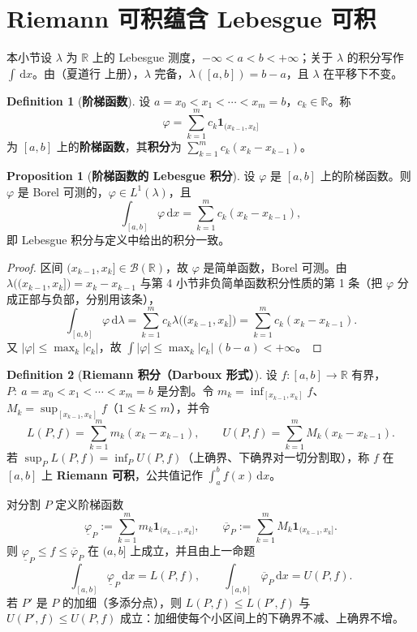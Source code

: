 \documentclass[oneside]{book}
\theoremstyle{definition}
\newcommand{\R}{\mathbb{R}}
\newcommand{\dd}{\mathrm{d}}
\theoremstyle{definition}
\newtheorem{proposition}{Proposition}[section]
\newtheorem{definition}{Definition}[section]
\begin{document}
	\section{Riemann 可积蕴含 Lebesgue 可积}
	
	本小节设 $\lambda$ 为 $\R$ 上的 Lebesgue 测度，$-\infty<a<b<+\infty$；关于 $\lambda$ 的积分写作 $\int\,\dd x$。由（夏道行 上册），$\lambda$ 完备，$\lambda([a,b])=b-a$，且 $\lambda$ 在平移下不变。
	
	\begin{definition}[\bfseries{阶梯函数}]
		设 $a=x_0<x_1<\cdots<x_m=b$，$c_k\in\R$。称
		\[
		\varphi=\sum_{k=1}^{m}c_k\mathbf{1}_{(x_{k-1},x_k]}
		\]
		为 $[a,b]$ 上的\textbf{阶梯函数}，其\textbf{积分}为 $\sum_{k=1}^{m}c_k(x_k-x_{k-1})$。
	\end{definition}
	
	\begin{proposition}[\bfseries{阶梯函数的 Lebesgue 积分}]
		设 $\varphi$ 是 $[a,b]$ 上的阶梯函数。则 $\varphi$ 是 Borel 可测的，$\varphi\in L^{1}(\lambda)$，且
		\[
		\int_{[a,b]}\varphi\,\dd x=\sum_{k=1}^{m}c_k(x_k-x_{k-1}),
		\]
		即 Lebesgue 积分与定义中给出的积分一致。
	\end{proposition}
	
	\begin{proof}
		区间 $(x_{k-1},x_k]\in\mathcal{B}(\R)$，故 $\varphi$ 是简单函数，Borel 可测。由 $\lambda\bigl((x_{k-1},x_k]\bigr)=x_k-x_{k-1}$ 与第 4 小节非负简单函数积分性质的第 1 条（把 $\varphi$ 分成正部与负部，分别用该条），
		\[
		\int_{[a,b]}\varphi\,\dd\lambda=\sum_{k=1}^{m}c_k\lambda\bigl((x_{k-1},x_k]\bigr)=\sum_{k=1}^{m}c_k(x_k-x_{k-1}).
		\]
		又 $|\varphi|\leqslant\max_k|c_k|$，故 $\int|\varphi|\leqslant\max_k|c_k|\,(b-a)<+\infty$。
	\end{proof}
	
	\begin{definition}[\bfseries{Riemann 积分（Darboux 形式）}]
		设 $f:[a,b]\to\R$ 有界，$P:\ a=x_0<x_1<\cdots<x_m=b$ 是分割。令 $m_k=\inf_{[x_{k-1},x_k]}f$、$M_k=\sup_{[x_{k-1},x_k]}f$（$1\leqslant k\leqslant m$），并令
		\[
		L(P,f)=\sum_{k=1}^{m}m_k(x_k-x_{k-1}),\qquad U(P,f)=\sum_{k=1}^{m}M_k(x_k-x_{k-1}).
		\]
		若 $\sup_P L(P,f)=\inf_P U(P,f)$（上确界、下确界对一切分割取），称 $f$ 在 $[a,b]$ 上 \textbf{Riemann 可积}，公共值记作 $\int_a^b f(x)\,\dd x$。
	\end{definition}
	
	对分割 $P$ 定义阶梯函数
	\[
	\underline{\varphi}_P:=\sum_{k=1}^{m}m_k\mathbf{1}_{(x_{k-1},x_k]},\qquad
	\overline{\varphi}_P:=\sum_{k=1}^{m}M_k\mathbf{1}_{(x_{k-1},x_k]} .
	\]
	则 $\underline{\varphi}_P\leqslant f\leqslant\overline{\varphi}_P$ 在 $(a,b]$ 上成立，并且由上一命题
	\[
	\int_{[a,b]}\underline{\varphi}_P\,\dd x=L(P,f),\qquad \int_{[a,b]}\overline{\varphi}_P\,\dd x=U(P,f).
	\]
	若 $P'$ 是 $P$ 的加细（多添分点），则 $L(P,f)\leqslant L(P',f)$ 与 $U(P',f)\leqslant U(P,f)$ 成立：加细使每个小区间上的下确界不减、上确界不增。
	
\end{document}

